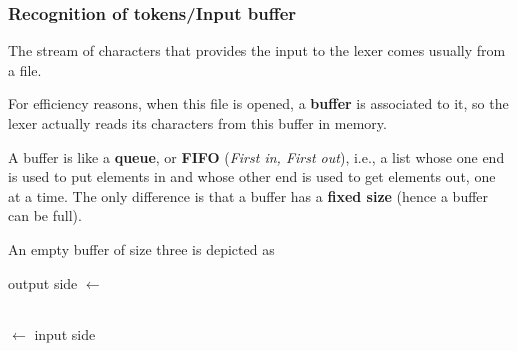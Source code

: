 % 
\begin{frame}
\frametitle{Recognition of tokens/Input buffer}

The stream of characters that provides the input to the lexer comes
usually from a file.

\bigskip

For efficiency reasons, when this file is opened, a \textbf{buffer} is
associated to it, so the lexer actually reads its characters from this
buffer in memory.

\bigskip

A buffer is like a \textbf{queue}, or \textbf{FIFO} (\emph{First in,
First out}), i.e., a list whose one end is used to put elements in and
whose other end is used to get elements out, one at a time. The only
difference is that a buffer has a \textbf{fixed size} (hence a buffer
can be full).

\bigskip

An empty buffer of size three is depicted as
\begin{center}
output side
\(\longleftarrow\)
\begin{tabular}{|@{\,}c@{\,}|@{\,}c@{\,}|@{\,}c@{\,}|}
  \hline
  \phantom{=}
& \phantom{=}
& \phantom{=}\\
  \hline
\end{tabular}
\(\longleftarrow\)
input side
\end{center}

\end{frame}

